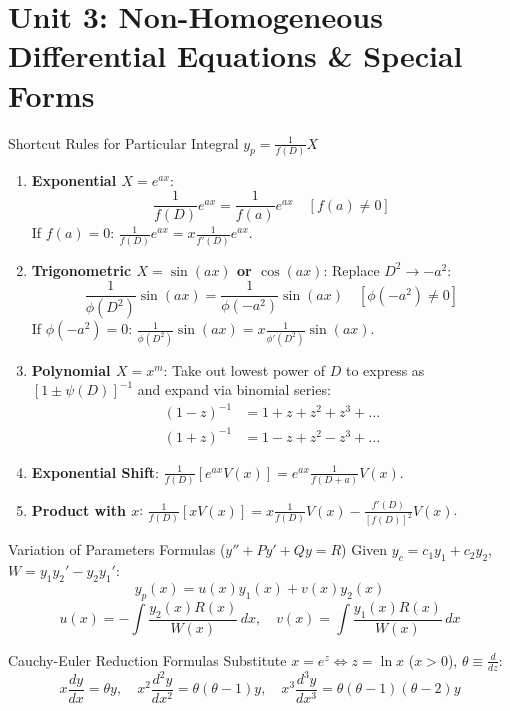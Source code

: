\chapter{Unit 3: Non-Homogeneous Differential Equations \& Special Forms}

\begin{formulabox}{Shortcut Rules for Particular Integral $y_p = \frac{1}{f(D)}X$}
\begin{enumerate}
    \item \textbf{Exponential $X = e^{ax}$}:
    \begin{equation*}
    \frac{1}{f(D)} e^{ax} = \frac{1}{f(a)} e^{ax} \quad [f(a) \neq 0]
    \end{equation*}
    If $f(a) = 0$: $\frac{1}{f(D)} e^{ax} = x \frac{1}{f'(D)} e^{ax}$.
    \item \textbf{Trigonometric $X = \sin(ax)$ or $\cos(ax)$}:
    Replace $D^2 \to -a^2$:
    \begin{equation*}
    \frac{1}{\phi(D^2)} \sin(ax) = \frac{1}{\phi(-a^2)} \sin(ax) \quad [\phi(-a^2) \neq 0]
    \end{equation*}
    If $\phi(-a^2) = 0$: $\frac{1}{\phi(D^2)} \sin(ax) = x \frac{1}{\phi'(D^2)} \sin(ax)$.
    \item \textbf{Polynomial $X = x^m$}:
    Take out lowest power of $D$ to express as $[1 \pm \psi(D)]^{-1}$ and expand via binomial series:
    \begin{align*}
    (1 - z)^{-1} &= 1 + z + z^2 + z^3 + \dots \\
    (1 + z)^{-1} &= 1 - z + z^2 - z^3 + \dots
    \end{align*}
    \item \textbf{Exponential Shift}: $\frac{1}{f(D)} [e^{ax} V(x)] = e^{ax} \frac{1}{f(D+a)} V(x)$.
    \item \textbf{Product with $x$}: $\frac{1}{f(D)} [x V(x)] = x \frac{1}{f(D)} V(x) - \frac{f'(D)}{[f(D)]^2} V(x)$.
\end{enumerate}
\end{formulabox}

\begin{formulabox}{Variation of Parameters Formulas ($y'' + Py' + Qy = R$)}
Given $y_c = c_1 y_1 + c_2 y_2$, $W = y_1 y_2' - y_2 y_1'$:
\begin{equation*}
y_p(x) = u(x) y_1(x) + v(x) y_2(x)
\end{equation*}
\begin{equation*}
u(x) = -\int \frac{y_2(x) R(x)}{W(x)} \, dx, \quad v(x) = \int \frac{y_1(x) R(x)}{W(x)} \, dx
\end{equation*}
\end{formulabox}

\begin{formulabox}{Cauchy-Euler Reduction Formulas}
Substitute $x = e^z \iff z = \ln x$ ($x > 0$), $\theta \equiv \frac{d}{dz}$:
\begin{equation*}
x \frac{dy}{dx} = \theta y, \quad x^2 \frac{d^2 y}{dx^2} = \theta(\theta - 1)y, \quad x^3 \frac{d^3 y}{dx^3} = \theta(\theta - 1)(\theta - 2)y
\end{equation*}
\end{formulabox}
